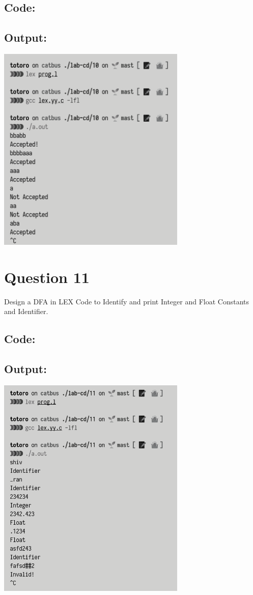 \documentclass{article}
\begin{document}
\subsection*{Code:}

\newpage
\subsection*{Output:}
\begin{center}
  \includegraphics[width=9cm]{10/out.png}
\end{center}

\newpage
\section*{Question 11}
Design a DFA in LEX Code to Identify and print Integer and Float Constants and Identifier.
\subsection*{Code:}

\newpage
\subsection*{Output:}
\begin{center}
  \includegraphics[width=9cm]{11/out.png}
\end{center}
\end{document}
